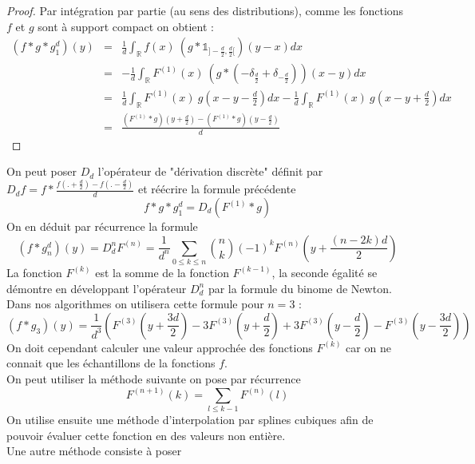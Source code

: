 \begin{proof}
Par intégration par partie (au sens des distributions), comme les fonctions $f$ et $g$ sont à support compact on obtient  :
\begin{eqnarray*}
(f * g *g_1^d )(y)&=&\frac{1}{d} \int_{\mathbb{R}} f(x)~(g * \mathds{1}_{]-\frac{d}{2},\frac{d}{2}[})(y-x) dx\\
                 &=& -\frac{1}{d} \int_{\mathbb{R}} F^{(1)}(x)~(g * (-\delta_{\frac{d}{2}}+\delta_{-\frac{d}{2}}))(x-y) dx\\
                 &=& \frac{1}{d} \int_{\mathbb{R}} F^{(1)}(x)~g(x-y-\frac{d}{2} )dx -\frac{1}{d} \int_{\mathbb{R}} F^{(1)}(x)~g(x-y+\frac{d}{2})dx\\
                 &=& \frac{(F^{(1)} * g)(y+\frac{d}{2})-(F^{(1)} * g )(y-\frac{d}{2})}{d}
\end{eqnarray*}
\end{proof}
On peut poser $D_d$ l'opérateur de "dérivation discrète" définit par $D_d f=f*\frac{f(.+\frac{d}{2})-f(.-\frac{d}{2})}{d}$ et réécrire la formule précédente 
\begin{equation*}
f * g *g_1^d =D_d (F^{(1)}*g)
\end{equation*}
On en déduit par récurrence la formule 
\begin{equation*}
(f*g_n^d)(y)=D_d ^n F^{(n)}= \frac{1}{d^n}\underset{0 \le k\le n}{\sum} \binom{n}{k}(-1)^{k} F^{(n)}(y+\frac{(n-2k)d}{2})
\end{equation*}
La fonction $F^{(k)}$ est la somme de la fonction  $F^{(k-1)}$, la seconde égalité se démontre en développant l'opérateur $D_d ^n$ par la formule du binome de Newton.\\
Dans nos algorithmes  on utilisera cette formule pour $n=3$ :
\begin{equation*}
(f*g_3)(y)=\frac{1}{d^3}(F^{(3)}(y+\frac{3d}{2})-3F^{(3)}(y+\frac{d}{2})+3F^{(3)}(y-\frac{d}{2})-F^{(3)}(y-\frac{3d}{2}))
\end{equation*}
On doit cependant calculer une valeur approchée des fonctions $F^{(k)}$  car on ne connait que les échantillons de la fonctions $f$.\\
On peut utiliser la méthode suivante on pose par récurrence
\begin{equation*}
F^{(n+1)}(k)=\underset{l\le k-1}{\sum}F^{(n)}(l)
\end{equation*}
On utilise ensuite une méthode d'interpolation par splines cubiques afin de pouvoir évaluer cette fonction en des valeurs non entière.\\
Une autre méthode consiste à poser 


